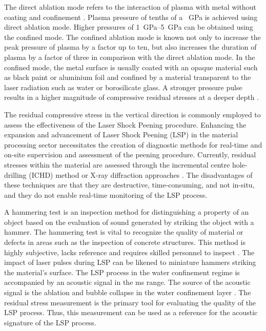 \documentclass[sn-nature]{sn-jnl}%
\theoremstyle{thmstyleone}%
\theoremstyle{thmstyletwo}%
\theoremstyle{thmstylethree}%
\begin{document}
The direct ablation mode refers to the interaction of plasma with metal without coating and confinement \cite{Ding2006}. Plasma pressure of tenths of a \SI{}{\GPa} is achieved using direct ablation mode. Higher pressures of \SIrange{1}{5}{\GPa} can be obtained using the confined mode. The confined ablation mode is known not only to increase the peak pressure of plasma by a factor up to ten, but also increases the duration of plasma by a factor of three in comparison with the direct ablation mode. In the confined mode, the metal surface is usually coated with an opaque material such as black paint or aluminium foil and confined by a material transparent to the laser radiation such as water or borosilicate glass. A stronger pressure pulse results in a higher magnitude of compressive residual stresses at a deeper depth \cite{Fairand19741015}. 



The residual compressive stress in the vertical direction is commonly employed to assess the effectiveness of the Laser Shock Peening procedure. Enhancing the expansion and advancement of Laser Shock Peening (LSP) in the material processing sector necessitates the creation of diagnostic methods for real-time and on-site supervision and assessment of the peening procedure. Currently, residual stresses within the material are assessed through the incremental centre hole-drilling (ICHD) method or X-ray diffraction approaches \cite{Steinzig2003}. The disadvantages of these techniques are that they are destructive, time-consuming, and not in-situ, and they do not enable real-time monitoring of the LSP process. 



A hammering test is an inspection method for distinguishing a property of an object based on the evaluation of sound generated by striking the object with a hammer. The hammering test is vital to recognize the quality of material or defects in areas such as the inspection of concrete structures. This method is highly subjective, lacks reference and requires skilled personnel to inspect \cite{LouhiKasahara2020}. The impact of laser pulses during LSP can be likened to miniature hammers striking the material's surface. The LSP process in the water confinement regime is accompanied by an acoustic signal in the ms range. The source of the acoustic signal is the ablation and bubble collapse in the water confinement layer \cite{Takata2016}. The residual stress measurement is the primary tool for evaluating the quality of the LSP process. Thus, this measurement can be used as a reference for the acoustic signature of the LSP process.
\end{document}
